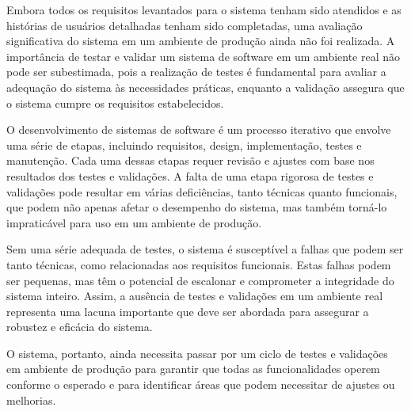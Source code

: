 Embora todos os requisitos levantados para o sistema tenham sido atendidos e as histórias de usuários detalhadas tenham sido completadas, uma avaliação significativa do sistema em um ambiente de produção ainda não foi realizada. A importância de testar e validar um sistema de software em um ambiente real não pode ser subestimada, pois a realização de testes é fundamental para avaliar a adequação do sistema às necessidades práticas, enquanto a validação assegura que o sistema cumpre os requisitos estabelecidos. 

O desenvolvimento de sistemas de software é um processo iterativo que envolve uma série de etapas, incluindo requisitos, design, implementação, testes e manutenção. Cada uma dessas etapas requer revisão e ajustes com base nos resultados dos testes e validações. A falta de uma etapa rigorosa de testes e validações pode resultar em várias deficiências, tanto técnicas quanto funcionais, que podem não apenas afetar o desempenho do sistema, mas também torná-lo impraticável para uso em um ambiente de produção.

Sem uma série adequada de testes, o sistema é susceptível a falhas que podem ser tanto técnicas, como relacionadas aos requisitos funcionais. Estas falhas podem ser pequenas, mas têm o potencial de escalonar e comprometer a integridade do sistema inteiro. Assim, a ausência de testes e validações em um ambiente real representa uma lacuna importante que deve ser abordada para assegurar a robustez e eficácia do sistema.

O sistema, portanto, ainda necessita passar por um ciclo de testes e validações em ambiente de produção para garantir que todas as funcionalidades operem conforme o esperado e para identificar áreas que podem necessitar de ajustes ou melhorias.
